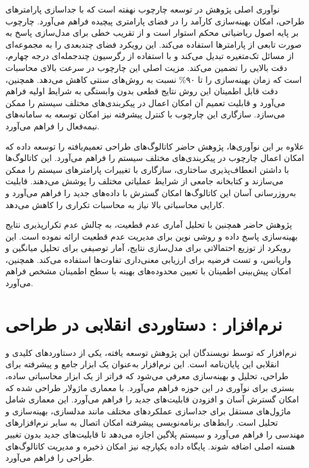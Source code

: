 نوآوری اصلی پژوهش در توسعه چارچوب  نهفته است که با جداسازی پارامترهای طراحی، امکان بهینه‌سازی کارآمد را در فضای پارامتری پیچیده فراهم می‌آورد. چارچوب  بر پایه اصول ریاضیاتی محکم استوار است و از تقریب خطی برای مدل‌سازی پاسخ  به صورت تابعی از پارامترها استفاده می‌کند. این رویکرد فضای چندبعدی را به مجموعه‌ای از مسائل تک‌متغیره تبدیل می‌کند و با استفاده از رگرسیون چندجمله‌ای درجه چهارم، دقت بالایی را تضمین می‌کند. مزیت اصلی این چارچوب در سرعت بالای محاسبات است که زمان بهینه‌سازی را تا ۹۰\% نسبت به روش‌های سنتی کاهش می‌دهد. همچنین، دقت قابل اطمینان این روش نتایج قطعی بدون وابستگی به شرایط اولیه فراهم می‌آورد و قابلیت تعمیم آن امکان اعمال در پیکربندی‌های مختلف سیستم را ممکن می‌سازد. سازگاری این چارچوب با کنترل پیشرفته نیز امکان توسعه به سامانه‌های نیمه‌فعال را فراهم می‌آورد.

علاوه بر این نوآوری‌ها، پژوهش حاضر کاتالوگ‌های طراحی تعمیم‌یافته را توسعه داده که امکان اعمال چارچوب  در پیکربندی‌های مختلف سیستم را فراهم می‌آورد. این کاتالوگ‌ها با داشتن انعطاف‌پذیری ساختاری، سازگاری با تغییرات پارامترهای سیستم را ممکن می‌سازند و کتابخانه جامعی از شرایط عملیاتی مختلف را پوشش می‌دهند. قابلیت به‌روزرسانی آسان این کاتالوگ‌ها امکان گسترش با داده‌های جدید را فراهم می‌آورد و کارایی محاسباتی بالا نیاز به محاسبات تکراری را کاهش می‌دهد.

پژوهش حاضر همچنین با تحلیل آماری عدم قطعیت، به چالش عدم تکرارپذیری نتایج بهینه‌سازی پاسخ داده و روشی نوین برای مدیریت عدم قطعیت ارائه نموده است. این رویکرد از توزیع احتمالاتی برای مدل‌سازی نتایج، آمار توصیفی برای تحلیل میانگین و واریانس، و تست فرضیه برای ارزیابی معنی‌داری تفاوت‌ها استفاده می‌کند. همچنین، امکان پیش‌بینی اطمینان با تعیین محدوده‌های بهینه با سطح اطمینان مشخص فراهم می‌آورد.

\section{نرم‌افزار : دستاوردی انقلابی در طراحی }

نرم‌افزار  که توسط نویسندگان این پژوهش توسعه یافته، یکی از دستاوردهای کلیدی و انقلابی این پایان‌نامه است. این نرم‌افزار به‌عنوان یک ابزار جامع و پیشرفته برای طراحی، تحلیل و بهینه‌سازی  معرفی می‌شود که فراتر از یک ابزار محاسباتی ساده، بستری برای نوآوری در این حوزه فراهم می‌آورد.  با معماری ماژولار طراحی شده که امکان گسترش آسان و افزودن قابلیت‌های جدید را فراهم می‌آورد. این معماری شامل ماژول‌های مستقل برای جداسازی عملکردهای مختلف مانند مدلسازی، بهینه‌سازی و تحلیل است. رابط‌های برنامه‌نویسی پیشرفته امکان اتصال به سایر نرم‌افزارهای مهندسی را فراهم می‌آورد و سیستم پلاگین اجازه می‌دهد تا قابلیت‌های جدید بدون تغییر هسته اصلی اضافه شوند. پایگاه داده یکپارچه نیز امکان ذخیره و مدیریت کاتالوگ‌های طراحی را فراهم می‌آورد.

